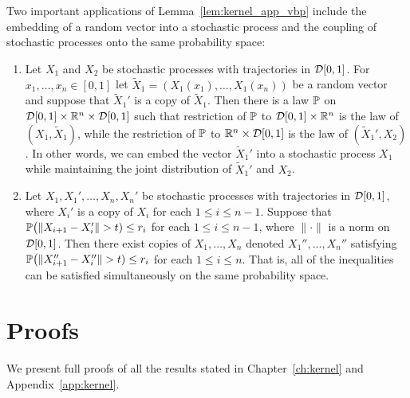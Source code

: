 \begin{remark}

  Two important applications of
  Lemma~\ref{lem:kernel_app_vbp} include
  the embedding of a random vector into a stochastic process
  and the coupling of stochastic processes
  onto the same probability space:
  \begin{enumerate}[label=(\roman*)]

    \item
      Let $X_1$ and $X_2$
      be stochastic processes with
      trajectories in $\cD[0,1]$.
      For $x_1, \ldots, x_n \in [0,1]$
      let $\tilde X_1 = (X_1(x_1), \ldots, X_1(x_n))$
      be a random vector
      and suppose that $\tilde X_1'$
      is a copy of $\tilde X_1$.
      Then there is a law $\P$ on
      $\cD[0,1] \times \R^n \times \cD[0,1]$
      such that restriction of $\P$ to
      $\cD[0,1] \times \R^n$
      is the law of $(X_1, \tilde X_1)$,
      while the restriction of $\P$ to
      $\R^n \times \cD[0,1]$
      is the law of $(\tilde X_1',X_2)$.
      In other words,
      we can embed the vector $\tilde X_1'$
      into a stochastic process $X_1$
      while maintaining the joint distribution of
      $\tilde X_1'$ and $X_2$.

    \item
      Let $X_1, X_1', \ldots, X_n, X_n'$
      be stochastic processes with
      trajectories in $\cD[0,1]$,
      where $X_i'$ is a copy of $X_i$
      for each $1 \leq i \leq n-1$.
      Suppose that
      $\P\big(\|X_{i+1} - X_i'\| > t)\leq r_i$
      for each $1 \leq i \leq n-1$,
      where $\|\cdot\|$ is a norm on $\cD[0,1]$.
      Then there exist copies of
      $X_1, \ldots, X_n$
      denoted
      $X_1'', \ldots, X_n''$
      satisfying
      $\P\big(\|X_{i+1}'' - X_i''\| > t)\leq r_i$
      for each $1 \leq i \leq n$.
      That is, all of the inequalities
      can be satisfied simultaneously
      on the same probability space.

  \end{enumerate}

\end{remark}

\section{Proofs}
\label{sec:kernel_app_proofs}

We present full proofs of all the results stated in
Chapter~\ref{ch:kernel} and Appendix~\ref{app:kernel}.

